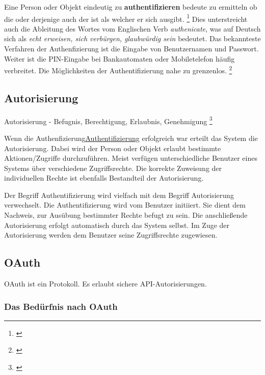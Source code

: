 Eine Person oder Objekt eindeutig zu \textbf{authentifizieren} bedeute
zu ermitteln ob die oder derjenige auch der ist als welcher er sich
ausgibt. \footnote{\autocite{authentifizierungsdef}} Dies unterstreicht
auch die Ableitung des Wortes vom Englischen Verb \emph{authenicate},
was auf Deutsch sich als \emph{echt erweisen, sich verbürgen,
glaubwürdig sein} bedeutet. Das bekannteste Verfahren der
Authenfizierung ist die Eingabe von Benutzernamen und Passwort. Weiter
ist die PIN-Eingabe bei Bankautomaten oder Mobiletelefon häufig
verbreitet. Die Möglichkeiten der Authentifizierung nahe zu grenzenlos.
\footnote{\autocite{authentifizierungsdeforg}}

\subsection{Autorisierung}\label{autorisierung}

Autorisierung - Befugnis, Berechtigung, Erlaubnis, Genehmigung
\footnote{\autocite{duden}}

Wenn die
Authenfizierung\protect\hyperlink{authentifizierung}{Authentifizierung}
erfolgreich war erteilt das System die Autorisierung. Dabei wird der
Person oder Objekt erlaubt bestimmte Aktionen/Zugriffe durchzuführen.
Meist verfügen unterschiedliche Benutzer eines Systems über verschiedene
Zugriffsrechte. Die korrekte Zuweisung der individuellen Rechte ist
ebenfalls Bestandteil der Autorisierung.

Der Begriff Authentifizierung wird vielfach mit dem Begriff
Autorisierung verwechselt. Die Authentifizierung wird vom Benutzer
initiiert. Sie dient dem Nachweis, zur Ausübung bestimmter Rechte befugt
zu sein. Die anschließende Autorisierung erfolgt automatisch durch das
System selbst. Im Zuge der Autorisierung werden dem Benutzer seine
Zugriffsrechte zugewiesen. \autocite{authentifizierungsdeforg}

\newpage

\hypertarget{oauth}{\subsection{OAuth}\label{oauth}}

OAuth ist ein Protokoll. Es erlaubt sichere API-Autorisierungen.

\subsubsection{Das Bedürfnis nach
OAuth}\label{das-beduxfcrfnis-nach-oauth}

